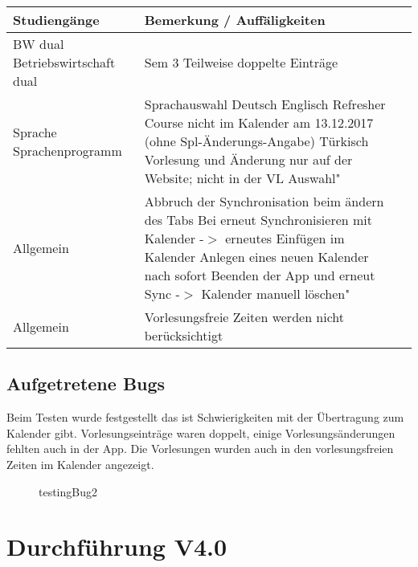 \noindent%
\begin{tabularx}{\textwidth}{|p{}|X|X| }
\hline
\textbf{Studiengänge} &\textbf{Bemerkung / Auffäligkeiten}   \\ \hline 

BW dual  Betriebswirtschaft dual & 
Sem 3 Teilweise doppelte Einträge  \\ \hline

Sprache  Sprachenprogramm & 
Sprachauswahl Deutsch
Englisch Refresher Course nicht im Kalender am 13.12.2017 (ohne Spl-Änderungs-Angabe)
Türkisch Vorlesung und Änderung nur auf der Website; nicht in der VL Auswahl"   \\ \hline
Allgemein & Abbruch der Synchronisation beim ändern des Tabs 
Bei erneut Synchronisieren mit Kalender -$>$ erneutes Einfügen im Kalender 
Anlegen eines neuen Kalender nach sofort Beenden der App und erneut Sync
-$>$ Kalender manuell löschen"  \\ \hline
Allgemein & Vorlesungsfreie Zeiten werden nicht berücksichtigt  \\ \hline
\end{tabularx}
\newpage
\subsection{Aufgetretene Bugs}
Beim Testen wurde festgestellt das ist Schwierigkeiten mit der Übertragung zum Kalender gibt. Vorlesungseinträge waren doppelt, einige Vorlesungsänderungen fehlten auch in der App. Die Vorlesungen wurden auch in den vorlesungsfreien Zeiten im Kalender angezeigt. \newline
 
\begin{figure}[H]
	\centering
	\caption{testingBug2}
	\label{fig1}
\end{figure}

\section{Durchführung V4.0}
